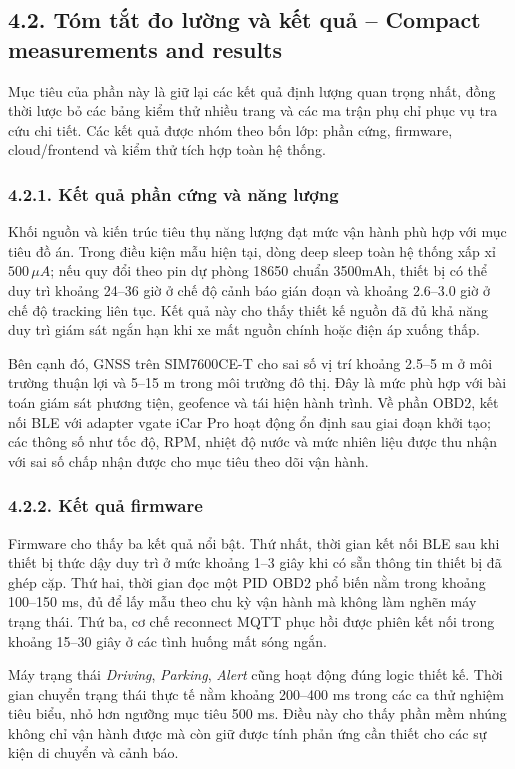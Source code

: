 \documentclass[a4paper]{extarticle}
\begin{document}
\subsection{4.2. Tóm tắt đo lường và kết quả -- Compact measurements and results}

Mục tiêu của phần này là giữ lại các kết quả định lượng quan trọng nhất, đồng thời lược bỏ các bảng kiểm thử nhiều trang và các ma trận phụ chỉ phục vụ tra cứu chi tiết. Các kết quả được nhóm theo bốn lớp: phần cứng, firmware, cloud/frontend và kiểm thử tích hợp toàn hệ thống.

\subsubsection{4.2.1. Kết quả phần cứng và năng lượng}

Khối nguồn và kiến trúc tiêu thụ năng lượng đạt mức vận hành phù hợp với mục tiêu đồ án. Trong điều kiện mẫu hiện tại, dòng deep sleep toàn hệ thống xấp xỉ \(500\,\mu A\); nếu quy đổi theo pin dự phòng 18650 chuẩn 3500mAh, thiết bị có thể duy trì khoảng 24--36 giờ ở chế độ cảnh báo gián đoạn và khoảng 2.6--3.0 giờ ở chế độ tracking liên tục. Kết quả này cho thấy thiết kế nguồn đã đủ khả năng duy trì giám sát ngắn hạn khi xe mất nguồn chính hoặc điện áp xuống thấp.

Bên cạnh đó, GNSS trên SIM7600CE-T cho sai số vị trí khoảng 2.5--5 m ở môi trường thuận lợi và 5--15 m trong môi trường đô thị. Đây là mức phù hợp với bài toán giám sát phương tiện, geofence và tái hiện hành trình. Về phần OBD2, kết nối BLE với adapter vgate iCar Pro hoạt động ổn định sau giai đoạn khởi tạo; các thông số như tốc độ, RPM, nhiệt độ nước và mức nhiên liệu được thu nhận với sai số chấp nhận được cho mục tiêu theo dõi vận hành.

\subsubsection{4.2.2. Kết quả firmware}

Firmware cho thấy ba kết quả nổi bật. Thứ nhất, thời gian kết nối BLE sau khi thiết bị thức dậy duy trì ở mức khoảng 1--3 giây khi có sẵn thông tin thiết bị đã ghép cặp. Thứ hai, thời gian đọc một PID OBD2 phổ biến nằm trong khoảng 100--150 ms, đủ để lấy mẫu theo chu kỳ vận hành mà không làm nghẽn máy trạng thái. Thứ ba, cơ chế reconnect MQTT phục hồi được phiên kết nối trong khoảng 15--30 giây ở các tình huống mất sóng ngắn.

Máy trạng thái \emph{Driving}, \emph{Parking}, \emph{Alert} cũng hoạt động đúng logic thiết kế. Thời gian chuyển trạng thái thực tế nằm khoảng 200--400 ms trong các ca thử nghiệm tiêu biểu, nhỏ hơn ngưỡng mục tiêu 500 ms. Điều này cho thấy phần mềm nhúng không chỉ vận hành được mà còn giữ được tính phản ứng cần thiết cho các sự kiện di chuyển và cảnh báo.
\end{document}
